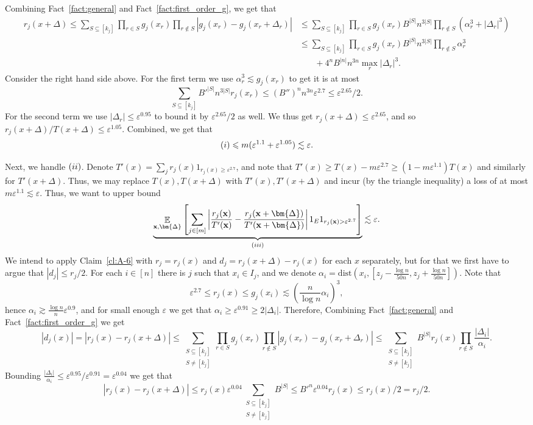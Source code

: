 \documentclass[10pt,a4paper]{article}
\newcommand\card[1]{\left| {#1} \right|}
\newcommand\Expect[2]{{\mathop{\mathbb{E}}_{#1}\left[ {#2} \right]}}
\newcommand\eps{\varepsilon}
\renewcommand\geq{\geqslant}
\renewcommand\leq{\leqslant}
\newcommand{\rom}[1]{\uppercase\expandafter{\romannumeral #1\relax}}
\newcommand{\al}{\alpha}
\newcommand{\De}{\Delta}
\def\gg{\gtrsim}
\def\ll{\lesssim}
\begin{document}
Combining Fact~\ref{fact:general} and Fact~\ref{fact:first_order_g}, we get that
\begin{align*}
r_j(x+\De)
\leq \sum\limits_{S\subseteq[k_j]}{
  \prod\limits_{r\in S}{g_j(x_r)}
  \prod\limits_{r\not\in S}{\card{g_j(x_r)-g_j(x_r+\De_r)}}}
&\leq \sum\limits_{S\subseteq[k_j]}{
\prod\limits_{r\in S}{g_j(x_r)}
B^{\card{S}} n^{3\card{S}}\prod\limits_{r\not\in S}(\alpha_r^3 + \card{\De_r}^3)}\\
&\leq \sum\limits_{S\subseteq[k_j]}{
\prod\limits_{r\in S}{g_j(x_r)}
B^{\card{S}} n^{3\card{S}}\prod\limits_{r\not\in S}\alpha_r^3}\\
&\phantom{\leq_S}+4^{n}B^{\card{n}}n^{3n}\max_{r}\card{\De_r}^3.
\end{align*}
Consider the right hand side above. For the first term we use $\alpha_r^3\ll g_j(x_r)$ to get it is at most
\[
\sum\limits_{S\subseteq[k_j]}{B'^{\card{S}} n^{3\card{S}} r_j(x_r)}
\leq (B'')^n n^{3n} \eps^{2.7} \leq \eps^{2.65}/2.
\]
For the second term we use $\card{\De_r}\leq \eps^{0.95}$ to bound it by $\eps^{2.65}/2$ as well.
We thus get $r_j(x+\De)\leq \eps^{2.65}$, and so $r_j(x+\De)/T(x+\De)\leq \eps^{1.05}$. Combined, we get that
\[
{(\rom{1})}\leq m(\eps^{1.1}+ \eps^{1.05})\ll \eps.
\]

Next, we handle $(\rom{2})$. Denote $T'(x) = \sum\limits_{j}{r_j(x) 1_{r_j(x)\geq \eps^{2.7}}}$, and note that
$T'(x)\geq T(x) - m\eps^{2.7}\geq (1-m\eps^{1.1})T(x)$ and similarly for $T'(x+\De)$. Thus, we may replace
$T(x), T(x+\De)$ with $T'(x), T'(x+\De)$ and incur (by the triangle inequality) a loss of at most $m\eps^{1.1}\ll \eps$.
Thus, we want to upper bound
\[
\underbrace{\Expect{{\bf x},\bm{\De}}{\sum\limits_{j\in [m]}\card{\frac{r_j({\bf x})}{T'({\bf x})}-\frac{r_j({\bf x}+\bm{\De})}{T'({\bf x}+\bm{\De})}} 1_E 1_{r_j({\bf x}) >\eps^{2.7}}}}_{(\rom{3})}\ll \eps.
\]
We intend to apply Claim~\ref{cl:A-6} with $r_j = r_j(x)$ and $d_j = r_j(x+\De) - r_j(x)$ for each $x$ separately, but for that
we first have to argue that $\card{d_j}\leq r_j/2$.
For each $i\in [n]$ there is $j$ such that $x_i\in I_j$, and we denote
$\al_i =\text{dist}\left(x_i, [z_j-\frac{\log n}{50n},z_j+\frac{\log n}{50n}]\right)$. Note that
\[
\eps^{2.7}\leq r_j(x) \leq g_j(x_i)\ll \left(\frac{n}{\log n}\alpha_i\right)^3,
\]
hence $\alpha_i\gg \frac{\log n}{n}\eps^{0.9}$, and for small enough $\eps$ we get that $\alpha_i\geq \eps^{0.91}\geq 2\card{\De_i}$. Therefore,
Combining Fact~\ref{fact:general} and Fact~\ref{fact:first_order_g} we get
\[
\card{d_j(x)}
=\card{r_j(x) - r_j(x+\De)}
\leq \sum\limits_{\substack{S\subseteq[k_j]\\S\neq[k_j]}}{
  \prod\limits_{r\in S}{g_j(x_r)}
  \prod\limits_{r\not\in S}{\card{g_j(x_r)-g_j(x_r+\De_r)}}}
\leq
\sum\limits_{\substack{S\subseteq[k_j]\\S\neq[k_j]}}{ B^{\card{S}} r_j(x)
\prod\limits_{r\not\in S}{\frac{\card{\De_i}}{\alpha_i}}}.
\]
Bounding $\frac{\card{\De_i}}{\alpha_i}\leq \eps^{0.95}/\eps^{0.91} = \eps^{0.04}$ we get that
\[
\card{r_j(x) - r_j(x+\De)}\leq r_j(x) \eps^{0.04}
\sum\limits_{\substack{S\subseteq[k_j]\\S\neq[k_j]}}{B^{\card{S}}}
\leq B'^n \eps^{0.04} r_j(x)
\leq r_j(x)/2 = r_j/2.
\]
\end{document}
